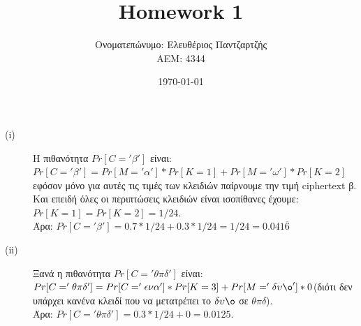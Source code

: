 \documentclass[12pt]{article}
\begin{document}
\centering
\title{Homework 1}
\author{Ονοματεπώνυμο: Ελευθέριος Παντζαρτζής \\  ΑΕΜ: 4344}
\date{\today}
\maketitle
\begin{description}
   \item [(i)] 
   Η πιθανότητα $Pr[C='\beta']$ είναι: $Pr[C='\beta']=Pr[M='\alpha']*Pr[K=1]+Pr[M='\omega']*Pr[K=2]$ εφόσον μόνο για αυτές τις τιμές των κλειδιών παίρνουμε την τιμή  ciphertext  β. Και επειδή όλες οι περιπτώσεις κλειδιών είναι ισοπίθανες έχουμε: $Pr[K=1]=Pr[K=2]=1/24$.\\Άρα: $Pr[C='\beta']=0.7*1/24+0.3*1/24=1/24=0.041\overline{6}$
   \item [(ii)]
   Ξανά η πιθανότητα $Pr[C='\theta\pi\delta']$ είναι: $Pr[C='\theta\pi\delta']=Pr[C='\epsilon\nu\alpha']*Pr[K=3]+Pr[M='\delta\upsilon\o']*0$(διότι δεν υπάρχει κανένα κλειδί που να μετατρέπει το $\delta\upsilon\o$ σε $\theta\pi\delta$).\\
   Άρα: $Pr[C='\theta\pi\delta']=0.3*1/24+0=0.0125$.
   \bigbreak
\end{description}
\end{document}
